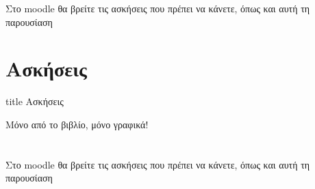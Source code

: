 \documentclass{presentation}
\begin{document}
\begin{frame}[noframenumbering]
  Στο moodle θα βρείτε τις ασκήσεις που πρέπει να κάνετε, όπως και αυτή τη παρουσίαση
\end{frame}

\section{Ασκήσεις}

\begin{frame}[noframenumbering]
  \vfill
  \centering
  \begin{beamercolorbox}[sep=8pt,center,shadow=true,rounded=true]{title}
    Ασκήσεις
  \end{beamercolorbox}
  \vfill
\end{frame}

\begin{askisi}
  Μόνο από το βιβλίο, μόνο γραφικά!
\end{askisi}

\section{}
\begin{frame}
  Στο moodle θα βρείτε τις ασκήσεις που πρέπει να κάνετε, όπως και αυτή τη παρουσίαση
\end{frame}
\end{document}
